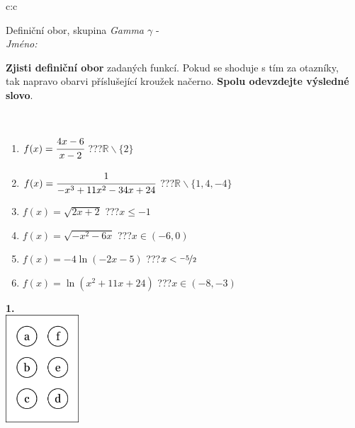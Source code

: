 \documentclass[10pt]{report}
\begin{document}
\begin{tabular}{c:c}
\begin{minipage}[c][104.5mm][t]{0.5\linewidth}
\begin{center}
\vspace{7mm}
{\huge Definiční obor, skupina \textit{Gamma $\gamma$} -}\\[5mm]
\textit{Jméno:}\phantom{xxxxxxxxxxxxxxxxxxxxxxxxxxxxxxxxxxxxxxxxxxxxxxxxxxxxxxxxxxxxxxxxx}\\[5mm]
\begin{minipage}{0.95\linewidth}
\begin{center}
\textbf{Zjisti definiční obor} zadaných funkcí. Pokud se shoduje s tím za otazníky,\\tak napravo obarvi příslušející kroužek načerno. \textbf{Spolu odevzdejte výsledné slovo}.
\end{center}
\end{minipage}
\\[1mm]
\begin{minipage}{0.79\linewidth}
\begin{center}
\begin{varwidth}{\linewidth}
\begin{enumerate}
\normalsizerrr
\item $f(x)=\cfrac{4x-6}{x-2}$\quad \dotfill\; ???\;\dotfill \quad $\mathbb{R}\smallsetminus\{2\}$
\item $f(x)=\cfrac{1}{-x^3+11x^2-34x+24}$\quad \dotfill\; ???\;\dotfill \quad $\mathbb{R}\smallsetminus\{1,4,-4\}$
\item $f(x)=\sqrt{2x+2}$\quad \dotfill\; ???\;\dotfill \quad $x\leq-1$
\item $f(x)=\sqrt{-x^2-6x}$\quad \dotfill\; ???\;\dotfill \quad $x\in(-6 , 0)$
\item $f(x)=-4\ln{(-2x-5)}$\quad \dotfill\; ???\;\dotfill \quad $x<\nicefrac{-5}{2}$
\item $f(x)=\ln{(x^2+11x+24)}$\quad \dotfill\; ???\;\dotfill \quad $x\in(-8 , -3)$
\end{enumerate}
\end{varwidth}
\end{center}
\end{minipage}
\begin{minipage}{0.20\linewidth}
\begin{center}
{\Huge\bfseries 1.} \\[2mm]
\includegraphics[height=40mm]{../images/braille.png}

\end{center}
\end{minipage}
\end{center}
\end{minipage}
\end{tabular}
\end{document}
